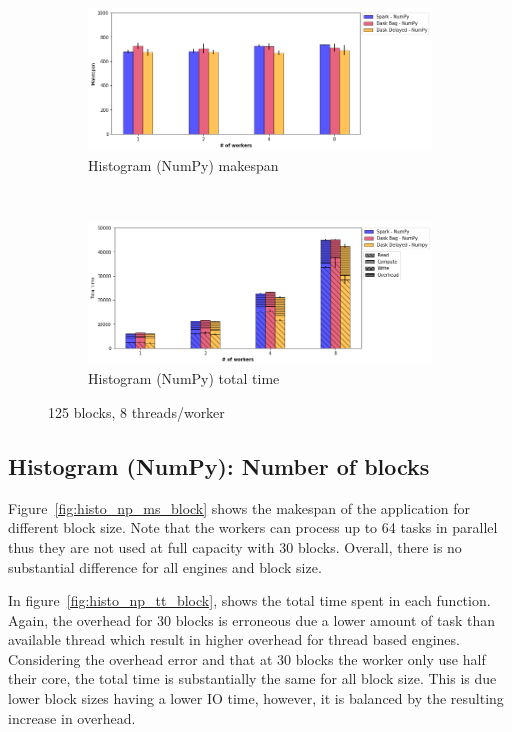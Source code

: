 \documentclass[conference]{IEEEtran}
\begin{document}
\begin{figure}[!t]
    \centering
    \begin{subfigure}[b]{\columnwidth}
        \includegraphics[clip,width=\columnwidth]{images/histo_np_worker.png}%
        \caption{Histogram (NumPy) makespan}\label{fig:histo_np_ms_worker}
    \end{subfigure}
    \\
    \begin{subfigure}[b]{\columnwidth}
        \includegraphics[clip,width=\columnwidth]{images/histo_idle_np_worker.png}%
        \caption{Histogram (NumPy) total time}\label{fig:histo_np_tt_worker}
    \end{subfigure}
    \caption{125 blocks, 8 threads/worker}
\end{figure}

\subsection{Histogram (NumPy): Number of blocks}
Figure~\ref{fig:histo_np_ms_block} shows the makespan of the application for
different block size. Note that the workers can process up to 64 tasks in parallel thus
they are not used at full capacity with 30 blocks. Overall, there is no substantial
difference for all engines and block size.

In figure~\ref{fig:histo_np_tt_block}, shows the total time spent in each function.
Again, the overhead for 30 blocks is erroneous due a lower amount of task than
available thread which result in higher overhead for thread based engines.
Considering the overhead error and that at 30 blocks the worker only use half their
core, the total time is substantially the same for all block size. This is due lower
block sizes having a lower IO time, however, it is balanced by the resulting increase
in overhead.
\end{document}
